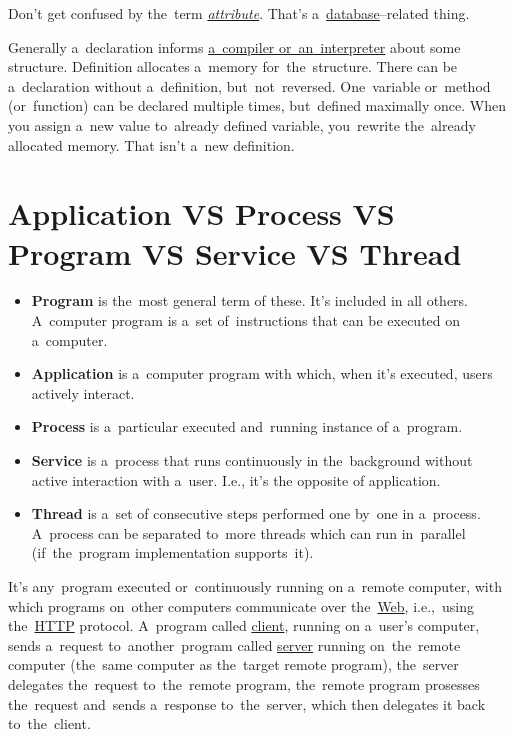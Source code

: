 \warning Don't get confused by the~term \hyperref[attributes]{\textit{attribute}}. That's a~\hyperref[databases]{database}--related thing.

\noindent Generally a~declaration informs \hyperref[compiledinterpretedlanguages]{a~compiler or~an~interpreter} about some structure. Definition allocates a~memory for~the~structure. There can be a~declaration without a~definition, but~not~reversed. One~variable or~method (or~function) can be declared multiple times, but~defined maximally once. When you assign a~new value to~already defined variable, you~rewrite the~already allocated memory. That isn't a~new definition.

\section*{\fontsize{17}{17} \selectfont Application VS Process VS Program VS Service VS Thread}
\label{applicationprocessprogramservicethread}
\begin{itemize}
    \item \textbf{Program} is the~most general term of these. It's included in all others. A~computer program is a~set of~instructions that can be executed on a~computer.
    \item \textbf{Application} is a~computer program with which, when it's executed, users actively interact.
    \item \textbf{Process} is a~particular executed and~running instance of a~program.
    \item \textbf{Service} is a~process that runs continuously in the~background without active interaction with a~user. I.e., it's the opposite of application.
    \item \textbf{Thread} is a~set of consecutive steps performed one by~one in a~process. A~process can be separated to~more threads which can run in~parallel (if~the~program implementation supports~it).
\end{itemize}

\label{webservice}
It's any~program executed or~continuously running on a~remote computer, with which programs on~other computers communicate over the~\hyperref[internetweb]{Web}, i.e.,~using the~\hyperref[http]{HTTP} protocol. A~program called \hyperref[clientserverarchitecture]{client}, running on a~user's computer, sends a~request to~another~program called \hyperref[clientserverarchitecture]{server} running on~the~remote computer (the~same computer as the~target remote program), the~server delegates the~request to~the~remote program, the~remote program prosesses the~request and~sends a~response to~the~server, which then delegates it back to~the~client.

